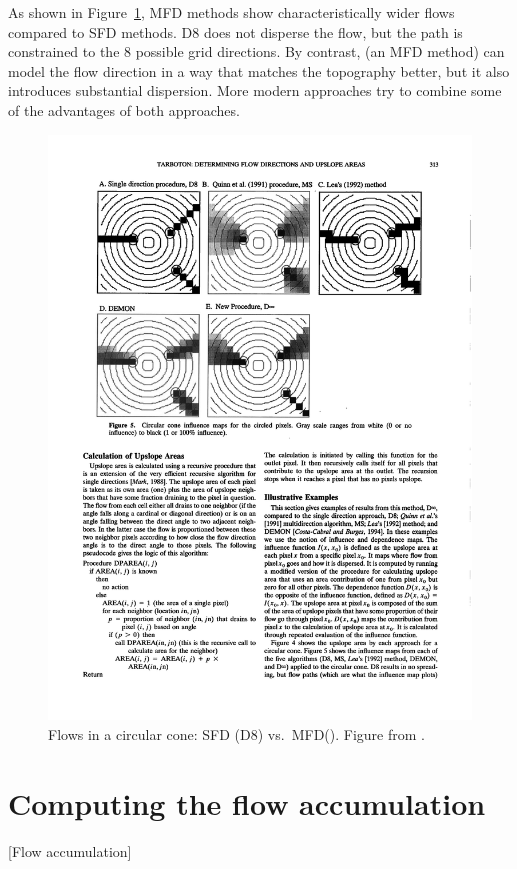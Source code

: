 As shown in Figure~\ref{fig:dispersion}, MFD methods show characteristically wider flows compared to SFD methods.
D8 does not disperse the flow, but the path is constrained to the 8 possible grid directions.
By contrast, \citet{Quinn91} (an MFD method) can model the flow direction in a way that matches the topography better, but it also introduces substantial dispersion.
More modern approaches try to combine some of the advantages of both approaches.

\begin{figure}[htbp]
\centering
\includegraphics[width=0.95\linewidth]{figs/dispersion.pdf}
\caption{Flows in a circular cone: SFD (D8) vs.\ MFD\@ (\citet{Quinn91}). Figure from \citet{Tarborton97}.}%
\label{fig:dispersion}
\end{figure}

\section{Computing the flow accumulation}[Flow accumulation]%
\label{se:accumulation}

